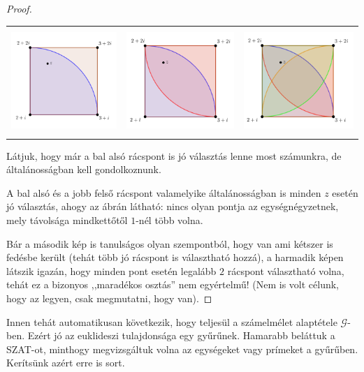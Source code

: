 \documentclass[12pt]{book}
\theoremstyle{plain} %
\theoremstyle{definition} %
\theoremstyle{remark}
\numberwithin{equation}{section}  %
\def\G{\mathcal{G}}
\begin{document}
\begin{proof}
		\begin{center}
			\begin{tabular}{c c c}
				\includegraphics[height=4cm]{eukl3.png}
				&
				\includegraphics[height=4cm]{eukl4.png}
				&
				\includegraphics[height=4cm]{eukl5.png} \\
			\end{tabular}
		\end{center}
		Látjuk, hogy már a bal alsó rácspont is jó választás lenne most számunkra, de általánosságban kell gondolkoznunk.
		
		A bal alsó és a jobb felső rácspont valamelyike általánosságban is minden $z$ esetén jó választás, ahogy az ábrán látható: nincs olyan pontja az egységnégyzetnek, mely távolsága mindkettőtől $1$-nél több volna.
		
		Bár a második kép is tanulságos olyan szempontból, hogy van ami kétszer is fedésbe került (tehát több jó rácspont is választható hozzá), a harmadik képen látszik igazán, hogy minden pont esetén legalább $2$ rácspont választható volna, tehát ez a bizonyos ,,maradékos osztás'' nem egyértelmű! (Nem is volt célunk, hogy az legyen, csak megmutatni, hogy van).
	\end{proof}

	Innen tehát automatikusan következik, hogy teljesül a számelmélet alaptétele $\G$-ben. Ezért jó az euklideszi tulajdonsága egy gyűrűnek. Hamarabb beláttuk a SZAT-ot, minthogy megvizsgáltuk volna az egységeket vagy prímeket a gyűrűben. Kerítsünk azért erre is sort.
	
\end{document}
